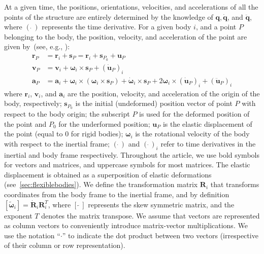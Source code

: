 \documentclass[wes, manuscript]{copernicus}
\renewcommand{\v}[1]{\boldsymbol{#1}}
\newcommand{\m}[1]{\boldsymbol{#1}}
\begin{document}
At a given time, the positions, orientations, velocities, and accelerations of all the points of the structure are entirely determined by the knowledge of $\v{q}, \v{\dot{q}}$, and $\v{\ddot{q}}$, where $(\,\v{\dot{}}\,)$ represents the time derivative.
For a given body $i$, and a point $P$ belonging to the body, the position, velocity, and acceleration of the point are given by~(see, e.g., \cite{shabana:book}):
\begin{align}
\v{r}_P &= \v{r}_i + \v{s}_P = \v{r}_i+\v{s}_{P_0}+\v{u}_P\\
\v{v}_P &= \v{v}_i + \v{\omega}_i\times\v{s}_{P} + (\v{\dot{u}}_P)_i\\
\v{a}_P &= \v{a}_i + \v{\omega}_i\times(\v{\omega}_i\times \v{s}_P) 
        + \v{\dot{\omega}}_i\times\v{s}_{P}
        + 2\v{\omega}_i\times (\v{\dot{u}}_P)_i
        + (\v{\ddot{u}}_P)_i
\end{align}
where $\v{r}_i$, $\v{v}_i$, and $\v{a}_i$ are the position, velocity, and acceleration of the origin of the body, respectively; $\v{s}_{P_0}$ is the initial (undeformed) position vector of point $P$ with respect to the body origin; the subscript $P$ is used for the deformed position of the point and $P_0$ for the underformed position;  $\v{u}_P$ is the elastic displacement of the point (equal to $0$ for rigid bodies); $\v{\omega}_i$ is the rotational velocity of the body with respect to the inertial frame;  $(\dot{\ })$ and $(\dot{\ })_i$ refer to time derivatives in the inertial and body frame respectively. 
Throughout the article, we use bold symbols for vectors and matrices, and uppercase symbols for most matrices.
The elastic displacement is obtained as a superposition of elastic deformations (see~\autoref{sec:flexiblebodies}).
We define the transformation matrix $\m{R}_i$ that transforms coordinates from the body frame to the inertial frame, and by definition
$[\v{\tilde{{\omega}}}_i] = \v{\dot{R}}_i\v{R}_i^T$, where $[\tilde{\ \ }]$ represents the skew symmetric matrix, and the exponent $T$ denotes the matrix transpose. 
We assume that vectors are represented as column vectors to conveniently introduce matrix-vector multiplications.
We use the notation ``$\cdot$'' to indicate the dot product between two vectors (irrespective of their column or row representation).
\end{document}
